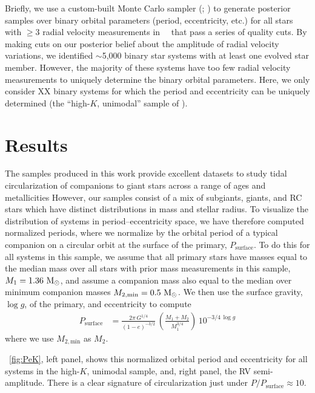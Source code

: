 \documentclass[modern, letterpaper]{aastex62}
\newcommand{\apogee}{\project{\acronym{APOGEE}}}
\newcommand{\DR}{\acronym{DR14}}
\begin{document}
Briefly, we use a custom-built Monte Carlo sampler (;
\citealt{Price-Whelan:2017}) to generate posterior samples over binary orbital
parameters (period, eccentricity, etc.) for all stars with $\geq 3$ radial
velocity measurements in \apogee\ \DR\ that pass a series of quality cuts.
By making cuts on our posterior belief about the amplitude of radial velocity
variations, we identified $\sim$5,000 binary star systems with at least one
evolved star member.
However, the majority of these systems have too few radial velocity measurements
to uniquely determine the binary orbital parameters.
Here, we only consider XX binary systems for which the period and eccentricity
can be uniquely determined (the ``high-$K$, unimodal'' sample of
\citealt{Price-Whelan:2018}).

\section{Results}
\label{sec:results}

The samples produced in this work provide excellent datasets to study tidal
circularization of companions to giant stars across a range of ages and
metallicities
However, our samples consist of a mix of subgiants, giants, and RC stars which
have distinct distributions in mass and stellar radius.
To visualize the distribution of systems in period--eccentricity space, we have
therefore computed normalized periods, where we normalize by the orbital period
of a typical companion on a circular orbit at the surface of the primary,
$P_{\textrm{surface}}$.
To do this for all systems in this sample, we assume that all primary stars have
masses equal to the median mass over all stars with prior mass measurements in
this sample, $M_1 = 1.36~\mathrm{M}_\odot$, and assume a companion mass also equal to the
median over minimum companion masses $M_{2, \textrm{min}} = 0.5~\mathrm{M}_\odot$.
We then use the surface gravity, $\log g$, of the primary, and eccentricity to
compute
\begin{align}
    P_{\textrm{surface}} &= \frac{2\pi \, G^{1/4}}{(1-e)^{-3/2}} \,
        \left(\frac{M_1 + M_2}{M_1^{3/4}}\right) \,
        10^{-3/4\,\log g}
\end{align}
where we use $M_{2, \textrm{min}}$ as $M_2$.

\figurename~\ref{fig:PeK}, left panel, shows this normalized orbital period and
eccentricity for all systems in the high-$K$, unimodal sample, and, right panel,
the RV semi-amplitude.
There is a clear signature of circularization just under $P/P_{\textrm{surface}}
\approx 10$.
\end{document}
